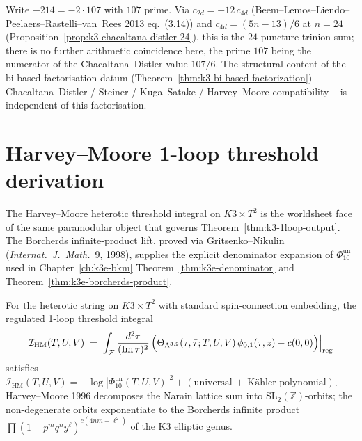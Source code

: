 \begin{remark}[Factorisation of \texorpdfstring{$c_{2d} = -214$}{c-2d = -214}]
\label{rem:k3-312-factorisations}
Write $-214 = -2 \cdot 107$ with $107$ prime. Via
$c_{2d} = -12\,c_{4d}$ (Beem--Lemos--Liendo--Peelaers--Rastelli--van~Rees
2013 eq.~(3.14)) and $c_{4d} = (5n-13)/6$ at $n = 24$
(Proposition~\ref{prop:k3-chacaltana-distler-24}), this is the
$24$-puncture trinion sum; there is no further arithmetic
coincidence here, the prime $107$ being the numerator of the
Chacaltana--Distler value $107/6$. The structural content of the
bi-based factorisation datum
(Theorem~\ref{thm:k3-bi-based-factorization}) --
Chacaltana--Distler / Steiner / Kuga--Satake / Harvey--Moore
compatibility -- is independent of this factorisation.
\end{remark}


\section{Harvey--Moore 1-loop threshold derivation}
\label{sec:harvey-moore-threshold}

The Harvey--Moore heterotic threshold integral on $K3\times T^2$ is the
worldsheet face of the same paramodular object that governs
Theorem~\ref{thm:k3-1loop-output}. The Borcherds infinite-product lift,
proved via Gritsenko--Nikulin (\emph{Internat.~J.~Math.}~9, 1998), supplies
the explicit denominator expansion of \(\Phi_{10}^{\mathrm{un}}\) used in
Chapter~\ref{ch:k3e-bkm} Theorem~\ref{thm:k3e-denominator} and
Theorem~\ref{thm:k3e-borcherds-product}.

\begin{theorem}
\label{thm:harvey-moore-threshold}
For the heterotic string on $K3\times T^2$ with standard spin-connection
embedding, the regulated 1-loop threshold integral
\begin{equation}
\label{eq:harvey-moore-threshold}
 \mathcal{I}_{\mathrm{HM}}(T,U,V)
 \;=\;
 \int_{\mathcal{F}}\frac{d^2\tau}{(\mathrm{Im}\,\tau)^2}\,
 \Bigl(\Theta_{\Lambda^{3,2}}(\tau,\bar\tau;T,U,V)\,
 \phi_{0,1}(\tau,z) - c(0,0)\Bigr)\Big|_{\mathrm{reg}}
\end{equation}
satisfies
$\mathcal{I}_{\mathrm{HM}}(T,U,V) = -\log|\Phi_{10}^{\mathrm{un}}(T,U,V)|^2 +
(\text{universal}\,+\,\text{K\"ahler polynomial})$.
Harvey--Moore 1996 decomposes the Narain lattice sum into
$\mathrm{SL}_2(\mathbb{Z})$-orbits; the non-degenerate orbits exponentiate to
the Borcherds infinite product
$\prod(1-p^m q^n y^\ell)^{c(4nm-\ell^2)}$ of the K3 elliptic genus.
\end{theorem}

